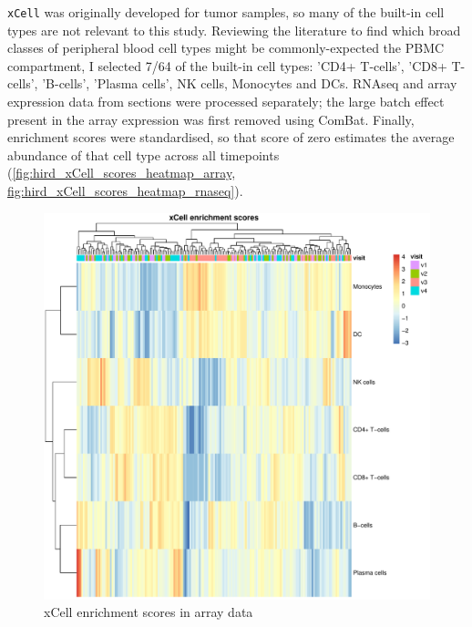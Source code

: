 %
\texttt{xCell} was originally developed for tumor samples, so many of the built-in cell types are not relevant to this study.
Reviewing the literature to find which broad classes of peripheral blood cell types might be commonly-expected the \gls{PBMC} compartment\autocite{davenport2018DiscoveringVivoCytokineeQTL},
I selected 7/64 of the built-in cell types: 'CD4+ T-cells', 'CD8+ T-cells', 'B-cells', 'Plasma cells', NK cells, Monocytes and DCs.
\gls{RNAseq} and array expression data from sections were processed separately; the large batch effect present in the array expression was first removed using ComBat.
Finally, enrichment scores were standardised, so that score of zero estimates the average abundance of that cell type across all timepoints (\autoref{fig:hird_xCell_scores_heatmap_array, fig:hird_xCell_scores_heatmap_rnaseq}).

\begin{figure}
    \centering
    \includegraphics[width=1.0\textwidth,page=1]{mainmatter/figures/chapter_03/get_xCell_estimates.dataset_array.plots.pdf}
    \caption{xCell enrichment scores in array data}
    \label{fig:hird_xCell_scores_heatmap_array}
\end{figure}

